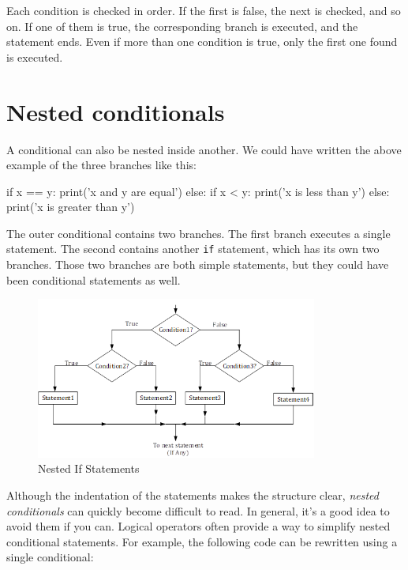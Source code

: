 Each condition is checked in order. If the first is false, the next is checked, and so on. If one of them is true, the corresponding branch is executed, and the statement ends. Even if more than one condition is true, only the first one found is executed.

\hypertarget{condicionales-anidados}{%
\section{Nested conditionals}\label{condicionales-anidados}}

 

A conditional can also be nested inside another. We could have written the above example of the three branches like this:

\begin{python}[frame=single]
if x == y:
    print('x and y are equal')
else:
    if x < y:
        print('x is less than y')
    else:
        print('x is greater than y')
\end{python}

The outer conditional contains two branches. The first branch executes a single statement. The second contains another \texttt{if} statement, which has its own two branches. Those two branches are both simple statements, but they could have been conditional statements as well.

\begin{figure}[H]
\centering
\includegraphics[width=350px]{images/nested-eng.png}
\caption{Nested If Statements}
\label{fig:nested}
\end{figure}

Although the indentation of the statements makes the structure clear, \emph{nested conditionals} can quickly become difficult to read. In general, it's a good idea to avoid them if you can. Logical operators often provide a way to simplify nested conditional statements. For example, the following code can be rewritten using a single conditional:

